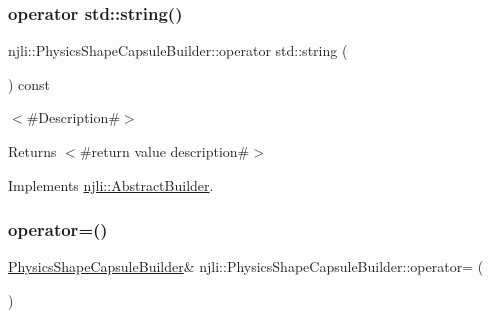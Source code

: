 \subsubsection{\texorpdfstring{operator std\+::string()}{operator std::string()}}
{\footnotesize\ttfamily njli\+::\+Physics\+Shape\+Capsule\+Builder\+::operator std\+::string (\begin{DoxyParamCaption}{ }\end{DoxyParamCaption}) const\hspace{0.3cm}{\ttfamily [virtual]}}

$<$\#\+Description\#$>$

\begin{DoxyReturn}{Returns}
$<$\#return value description\#$>$ 
\end{DoxyReturn}


Implements \mbox{\hyperlink{classnjli_1_1_abstract_builder_a3e6e553e06d1ca30517ad5fb0bd4d000}{njli\+::\+Abstract\+Builder}}.

\mbox{\label{classnjli_1_1_physics_shape_capsule_builder_a02d75bb339253e9aa94acc9ae4229bef}} 
\subsubsection{\texorpdfstring{operator=()}{operator=()}}
{\footnotesize\ttfamily \mbox{\hyperlink{classnjli_1_1_physics_shape_capsule_builder}{Physics\+Shape\+Capsule\+Builder}}\& njli\+::\+Physics\+Shape\+Capsule\+Builder\+::operator= (\begin{DoxyParamCaption}\item[{const \mbox{\hyperlink{classnjli_1_1_physics_shape_capsule_builder}{Physics\+Shape\+Capsule\+Builder}} \&}]{ }\end{DoxyParamCaption})\hspace{0.3cm}{\ttfamily [protected]}}

\mbox{\label{classnjli_1_1_physics_shape_capsule_builder_ac3f3335354278473758cab0428df5216}} 

